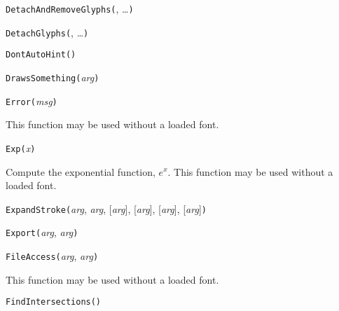

\texttt{DetachAndRemoveGlyphs(}, \ldots\texttt{)}



\texttt{DetachGlyphs(}, \ldots\texttt{)}



\texttt{DontAutoHint(}\texttt{)}



\texttt{DrawsSomething(}\textit{arg}\texttt{)}



\texttt{Error(}\textit{msg}\texttt{)}

This function may be used without a loaded font.



\texttt{Exp(}\textit{x}\texttt{)}

Compute the exponential function, $e^x$.
This function may be used without a loaded font.



\texttt{ExpandStroke(}\textit{arg}, \textit{arg}, [\textit{arg}], [\textit{arg}], [\textit{arg}], [\textit{arg}]\texttt{)}



\texttt{Export(}\textit{arg}, \textit{arg}\texttt{)}



\texttt{FileAccess(}\textit{arg}, \textit{arg}\texttt{)}

This function may be used without a loaded font.



\texttt{FindIntersections(}\texttt{)}

